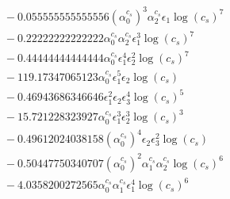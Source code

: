 \documentclass[10pt]{article}
\begin{document}
\begin{align*}
&{}  - 0.055555555555556 \left(\alpha_{0}^{c_s}\right)^{3} \alpha_{2}^{c_s} \epsilon_{1} \log{\left(c_{s} \right)}^{7} \\
&{}  - 0.22222222222222 \alpha_{0}^{c_s} \alpha_{2}^{c_s} \epsilon_{1}^{3} \log{\left(c_{s} \right)}^{7} \\
&{}  - 0.44444444444444 \alpha_{0}^{c_s} \epsilon_{1}^{4} \epsilon_{2}^{2} \log{\left(c_{s} \right)}^{7} \\
&{}  - 119.17347065123 \alpha_{0}^{c_s} \epsilon_{1}^{5} \epsilon_{2} \log{\left(c_{s} \right)} \\
&{}  - 0.46943686346646 \epsilon_{1}^{2} \epsilon_{2} \epsilon_{3}^{4} \log{\left(c_{s} \right)}^{5} \\
&{}  - 15.721228323927 \alpha_{0}^{c_s} \epsilon_{1}^{3} \epsilon_{2}^{3} \log{\left(c_{s} \right)}^{3} \\
&{}  - 0.49612024038158 \left(\alpha_{0}^{c_s}\right)^{4} \epsilon_{2} \epsilon_{3}^{2} \log{\left(c_{s} \right)} \\
&{}  - 0.50447750340707 \left(\alpha_{0}^{c_s}\right)^{2} \alpha_{1}^{c_s} \alpha_{2}^{c_s} \log{\left(c_{s} \right)}^{6} \\
&{}  - 4.0358200272565 \alpha_{0}^{c_s} \alpha_{1}^{c_s} \epsilon_{1}^{4} \log{\left(c_{s} \right)}^{6}
\end{align*}
\end{document}
